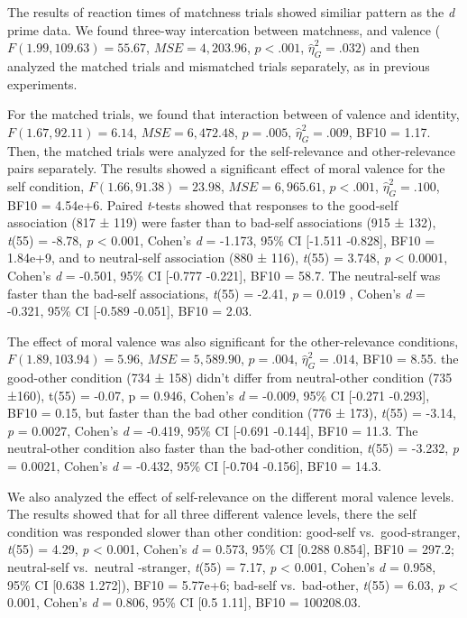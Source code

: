 \documentclass[man]{apa6}
\begin{document}
The results of reaction times of matchness trials showed similiar pattern as the \emph{d} prime data. We found three-way intercation between matchness, and valence (\(F(1.99, 109.63) = 55.67\), \(\mathit{MSE} = 4,203.96\), \(p < .001\), \(\hat{\eta}^2_G = .032\)) and then analyzed the matched trials and mismatched trials separately, as in previous experiments.

For the matched trials, we found that interaction between of valence and identity, \(F(1.67, 92.11) = 6.14\), \(\mathit{MSE} = 6,472.48\), \(p = .005\), \(\hat{\eta}^2_G = .009\), BF10 = 1.17. Then, the matched trials were analyzed for the self-relevance and other-relevance pairs separately. The results showed a significant effect of moral valence for the self condition, \(F(1.66, 91.38) = 23.98\), \(\mathit{MSE} = 6,965.61\), \(p < .001\), \(\hat{\eta}^2_G = .100\), BF10 = 4.54e+6. Paired \emph{t}-tests showed that responses to the good-self association (817 ± 119) were faster than to bad-self associations (915 ± 132), \emph{t}(55) = -8.78, \emph{p} \textless{} 0.001, Cohen's \emph{d} = -1.173, 95\% CI {[}-1.511 -0.828{]}, BF10 = 1.84e+9, and to neutral-self association (880 ± 116), \emph{t}(55) = 3.748, \emph{p} \textless{} 0.0001, Cohen's \emph{d} = -0.501, 95\% CI {[}-0.777 -0.221{]}, BF10 = 58.7. The neutral-self was faster than the bad-self associations, \emph{t}(55) = -2.41, \emph{p} = 0.019 , Cohen's \emph{d} = -0.321, 95\% CI {[}-0.589 -0.051{]}, BF10 = 2.03.

The effect of moral valence was also significant for the other-relevance conditions, \(F(1.89, 103.94) = 5.96\), \(\mathit{MSE} = 5,589.90\), \(p = .004\), \(\hat{\eta}^2_G = .014\), BF10 = 8.55. the good-other condition (734 ± 158) didn't differ from neutral-other condition (735 ±160), t(55) = -0.07, p = 0.946, Cohen's \emph{d} = -0.009, 95\% CI {[}-0.271 -0.293{]}, BF10 = 0.15, but faster than the bad other condition (776 ± 173), \emph{t}(55) = -3.14, \emph{p} = 0.0027, Cohen's \emph{d} = -0.419, 95\% CI {[}-0.691 -0.144{]}, BF10 = 11.3. The neutral-other condition also faster than the bad-other condition, \emph{t}(55) = -3.232, \emph{p} = 0.0021, Cohen's \emph{d} = -0.432, 95\% CI {[}-0.704 -0.156{]}, BF10 = 14.3.

We also analyzed the effect of self-relevance on the different moral valence levels. The results showed that for all three different valence levels, there the self condition was responded slower than other condition: good-self vs.~good-stranger, \emph{t}(55) = 4.29, \emph{p} \textless{} 0.001, Cohen's \emph{d} = 0.573, 95\% CI {[}0.288 0.854{]}, BF10 = 297.2; neutral-self vs.~neutral -stranger, \emph{t}(55) = 7.17, \emph{p} \textless{} 0.001, Cohen's \emph{d} = 0.958, 95\% CI {[}0.638 1.272{]}), BF10 = 5.77e+6; bad-self vs.~bad-other, \emph{t}(55) = 6.03, \emph{p} \textless{} 0.001, Cohen's \emph{d} = 0.806, 95\% CI {[}0.5 1.11{]}, BF10 = 100208.03.
\end{document}
